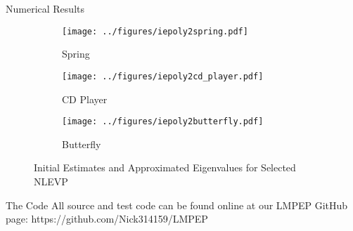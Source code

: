 \documentclass[final,hyperref={pdfpagelabels=false}]{beamer}
\begin{document}
	\begin{block}{Numerical Results}
\begin{figure}
	\centering
	\begin{subfigure}{.3\textwidth}
		\centering
		\texttt{[image: ../figures/iepoly2spring.pdf]}
		\caption{Spring}
		\label{fig:sub1}
	\end{subfigure}%
	\begin{subfigure}{.3\textwidth}
		\centering
		\texttt{[image: ../figures/iepoly2cd\_player.pdf]}
		\caption{CD Player}
		\label{fig:sub2}
	\end{subfigure}
	\begin{subfigure}{.3\textwidth}
	\centering
		\texttt{[image: ../figures/iepoly2butterfly.pdf]}
	\caption{Butterfly}
	\label{fig:sub2}
\end{subfigure}
	\caption{Initial Estimates and Approximated Eigenvalues for Selected NLEVP~\cite{Betcke2013 Problems}}
	\label{fig:test}
\end{figure}
	\end{block}
	\begin{block}{The Code}
	All source and test code can be found online at our LMPEP GitHub page: https://github.com/Nick314159/LMPEP
    \end{block}
\end{document}
